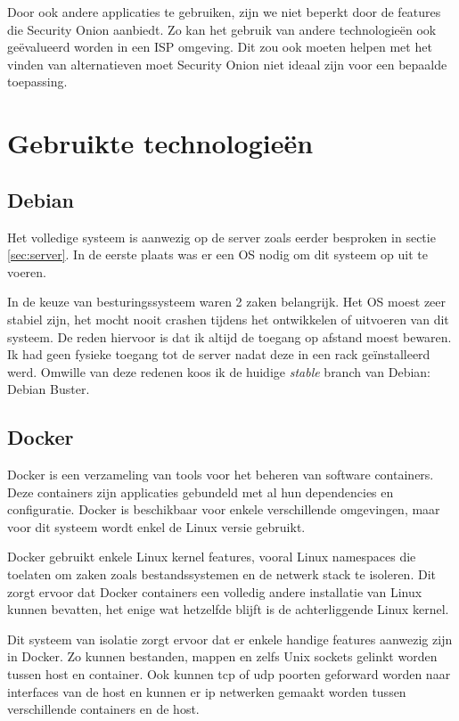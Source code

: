 \documentclass[a4paper,12pt]{report}
\begin{document}
Door ook andere applicaties te gebruiken, zijn we niet beperkt door de features die Security Onion aanbiedt.
Zo kan het gebruik van andere technologieën ook geëvalueerd worden in een ISP omgeving.
Dit zou ook moeten helpen met het vinden van alternatieven moet Security Onion niet ideaal zijn voor een bepaalde toepassing.

\section{Gebruikte technologie\"en}
\subsection{Debian}
Het volledige systeem is aanwezig op de server zoals eerder besproken in sectie \ref{sec:server}.
In de eerste plaats was er een OS nodig om dit systeem op uit te voeren.

In de keuze van besturingssysteem waren 2 zaken belangrijk.
Het OS moest zeer stabiel zijn, het mocht nooit crashen tijdens het ontwikkelen of uitvoeren van dit systeem.
De reden hiervoor is dat ik altijd de toegang op afstand moest bewaren.
Ik had geen fysieke toegang tot de server nadat deze in een rack geïnstalleerd werd.
Omwille van deze redenen koos ik de huidige \emph{stable} branch van Debian: Debian Buster.

\subsection{Docker}
Docker is een verzameling van tools voor het beheren van software containers.
Deze containers zijn applicaties gebundeld met al hun dependencies en configuratie.
Docker is beschikbaar voor enkele verschillende omgevingen, maar voor dit systeem wordt enkel de Linux versie gebruikt.

Docker gebruikt enkele Linux kernel features, vooral Linux namespaces die toelaten om zaken zoals bestandssystemen en de netwerk stack te isoleren.
Dit zorgt ervoor dat Docker containers een volledig andere installatie van Linux kunnen bevatten, het enige wat hetzelfde blijft is de achterliggende Linux kernel.

Dit systeem van isolatie zorgt ervoor dat er enkele handige features aanwezig zijn in Docker.
Zo kunnen bestanden, mappen en zelfs Unix sockets gelinkt worden tussen host en container.
Ook kunnen tcp of udp poorten geforward worden naar interfaces van de host en kunnen er ip netwerken gemaakt worden tussen verschillende containers en de host.
\end{document}
